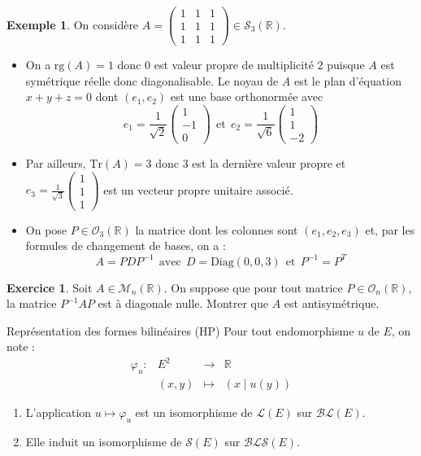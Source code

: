 \documentclass[french]{article}
\newcommand{\R}{\mathbb{R}}
\newcommand{\inv}{^{-1}}
\newcommand{\Tr}{\text{Tr}}
\theoremstyle{plain}
\theoremstyle{definition}
\newtheorem*{ex}{Exemple}
\newtheorem{exo}{Exercice}
\theoremstyle{remark}
\begin{document}
\begin{ex}
	On considère $A=\displaystyle\begin{pmatrix}
		1&1&1\\
		1&1&1\\
		1&1&1
	\end{pmatrix}\in\mathcal{S}_3(\R)$.
	\begin{itemize}
		\item On a $\text{rg}(A)=1$ donc $0$ est valeur propre de multiplicité $2$ puisque $A$ est symétrique réelle donc diagonalisable. Le noyau de $A$ est le plan d'équation $x+y+z=0$ dont $(e_1,e_2)$ est une base orthonormée avec $$e_1=\frac{1}{\sqrt{2}}\begin{pmatrix}
			1\\
			-1\\
			0
		\end{pmatrix}\ \ \text{et}\ \ e_2=\frac{1}{\sqrt{6}}\begin{pmatrix}
		1\\
		1\\
		-2
		\end{pmatrix}$$
		\item Par ailleurs, $\Tr(A)=3$ donc $3$ est la dernière valeur propre et $e_3=\displaystyle\frac{1}{\sqrt{3}}\begin{pmatrix}
			1\\
			1\\
			1
		\end{pmatrix}$ est un vecteur propre unitaire associé.
		\item On pose $P\in\mathcal{O}_3(\R)$ la matrice dont les colonnes sont $(e_1,e_2,e_3)$ et, par les formules de changement de bases, on a : $$A=PDP\inv\ \ \text{avec}\ \ D=\text{Diag}(0,0,3)\ \ \text{et}\ \ P\inv=P^T$$
	\end{itemize}
\end{ex}

\begin{exo}
	Soit $A\in\mathcal{M}_n(\R)$. On suppose que pour tout matrice $P\in\mathcal{O}_n(\R)$, la matrice $P\inv AP$ est à diagonale nulle. Montrer que $A$ est antisymétrique.
\end{exo}

\begin{thm}{Représentation des formes bilinéaires (HP)}
	Pour tout endomorphisme $u$ de $E$, on note : $$\begin{array}{lrcl}
		\varphi_u:&E^2&\longrightarrow&\R \\
		&(x,y)&\longmapsto&(x\mid u(y))
	\end{array}$$
	\begin{enumerate}
		\item L'application $u\mapsto\varphi_u$ est un isomorphisme de $\mathcal{L}(E)$ sur $\mathcal{BL}(E)$.
		\item Elle induit un isomorphisme de $\mathcal{S}(E)$ sur $\mathcal{BLS}(E)$.
	\end{enumerate}
\end{thm}
\end{document}
